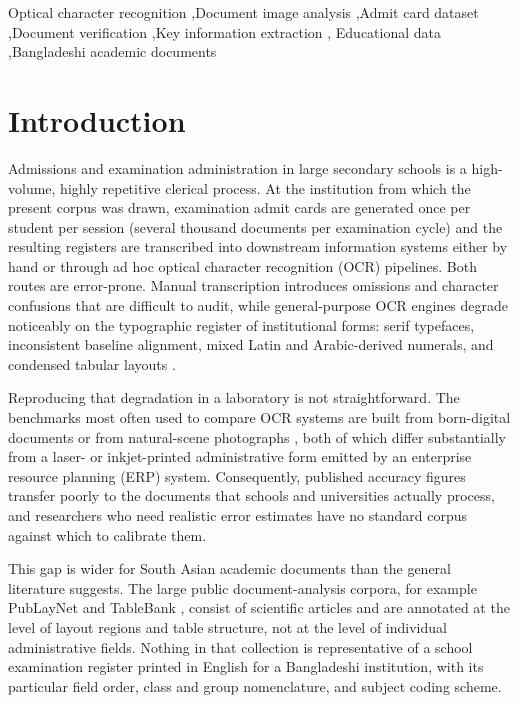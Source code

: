 \documentclass[a4paper,fleqn]{cas-dc}
\begin{document}
\begin{keywords}
Optical character recognition \sep Document image analysis \sep Admit card
dataset \sep Document verification \sep Key information extraction \sep
Educational data \sep Bangladeshi academic documents
\end{keywords}

\maketitle

\section{Introduction}

Admissions and examination administration in large secondary schools is a
high-volume, highly repetitive clerical process. At the institution from which
the present corpus was drawn, examination admit cards are generated once per
student per session (several thousand documents per examination cycle) and
the resulting registers are transcribed into downstream information systems
either by hand or through ad hoc optical character recognition (OCR) pipelines.
Both routes are error-prone. Manual transcription introduces omissions and
character confusions that are difficult to audit, while general-purpose OCR
engines degrade noticeably on the typographic register of institutional
forms: serif typefaces, inconsistent baseline alignment, mixed Latin and
Arabic-derived numerals, and condensed tabular layouts \citep{smith2007,
reuel2019}.

Reproducing that degradation in a laboratory is not straightforward. The
benchmarks most often used to compare OCR systems are built from born-digital
documents or from natural-scene photographs \citep{jaderberg2014}, both of
which differ substantially from a laser- or inkjet-printed administrative form
emitted by an enterprise resource planning (ERP) system. Consequently, published
accuracy figures transfer poorly to the documents that schools and universities
actually process, and researchers who need realistic error estimates have no
standard corpus against which to calibrate them.

This gap is wider for South Asian academic documents than the general
literature suggests. The large public document-analysis corpora, for example
PubLayNet \citep{zhong2019} and TableBank \citep{li2019}, consist of
scientific articles and are annotated at the level of layout regions and table
structure, not at the level of individual administrative fields. Nothing in
that collection is representative of a school examination register printed in
English for a Bangladeshi institution, with its particular field order, class
and group nomenclature, and subject coding scheme.
\end{document}
